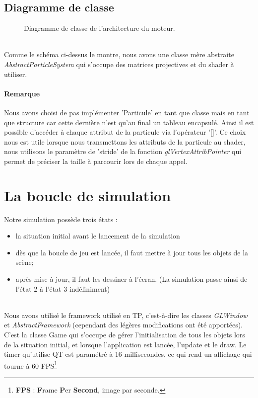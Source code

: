   \subsection{Diagramme de classe}
   
     \begin{figure}[H]
      \centering
      \caption{Diagramme de classe de l'architecture du moteur.}
      \label{fig:arc_class_diagram}
     \end{figure}
	~\\
\indent Comme le schéma ci-dessus le montre, nous avons une classe mère abstraite \textit{AbstractParticleSystem} qui s'occupe des matrices projectives et du shader à utiliser. %
   \paragraph{Remarque} Nous avons choisi de pas implémenter 'Particule' en tant que classe mais en tant que structure car cette dernière n'est qu'au final un tableau encapsulé. Ainsi il est possible d'accéder à chaque attribut de la particule via l'opérateur '[]'. Ce choix nous est utile lorsque nous transmettons les attributs de la particule au shader, nous utilisons le paramètre de 'stride' de la fonction \textit{glVertexAttribPointer} qui permet de préciser la taille à parcourir lors de chaque appel.
 \section{La boucle de simulation}
  Notre simulation possède trois états :
   \begin{itemize}
    \item[1] la situation initial avant le lancement de la simulation
    \item[2] dès que la boucle de jeu est lancée, il faut mettre à jour tous les objets de la scène;
    \item[3] après mise à jour, il faut les dessiner à l'écran. (La simulation passe ainsi de l'état 2 à l'état 3 indéfiniment)
   \end{itemize}
   ~\\
\indent Nous avons utilisé le framework utilisé en TP, c'est-à-dire les classes \textit{GLWindow} et \textit{AbstractFramework} (cependant des légères modifications ont été apportées). C'est la classe Game qui s'occupe de gérer l'initialisation de tous les objets lors de la situation initial, et lorsque l'application est lancée, l'update et le draw. Le timer qu'utilise QT est paramétré à 16 millisecondes, ce qui rend un affichage qui tourne à 60 FPS\footnote{\textbf{FPS} : \textbf{F}rame \textbf{P}er \textbf{Second}, image par seconde.}
